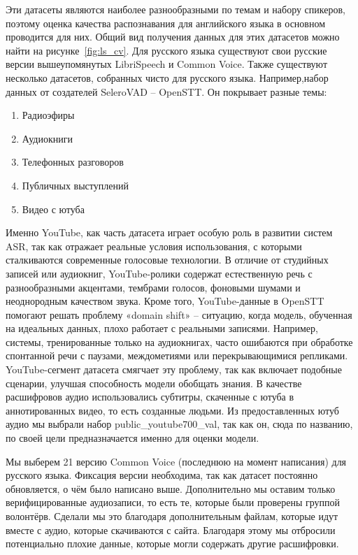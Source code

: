 Эти датасеты являются наиболее разнообразными по темам и набору спикеров, поэтому оценка качества распознавания для английского языка в основном проводится для них.
Общий вид получения данных для этих датасетов можно найти на рисунке~\ref{fig:ls_cv}.
Для русского языка существуют свои русские версии вышеупомянутых LibriSpeech и Common Voice.
Также существуют несколько датасетов, собранных чисто для русского языка. 
Например,набор данных от создателей SeleroVAD -- OpenSTT\cite{andrusenko2020exploration}. 
Он покрывает разные темы: 
\begin{enumerate}
  \item Радиоэфиры
  \item Аудиокниги
  \item Телефонных разговоров
  \item Публичных выступлений
  \item Видео с ютуба
\end{enumerate}
Именно YouTube, как часть датасета играет особую роль в развитии систем ASR, так как отражает реальные условия использования, с которыми сталкиваются современные голосовые технологии.
В отличие от студийных записей или аудиокниг, YouTube-ролики содержат естественную речь с разнообразными акцентами, тембрами голосов, фоновыми шумами и неоднородным качеством звука. 
Кроме того, YouTube-данные в OpenSTT помогают решать проблему «domain shift» -- ситуацию, когда модель, обученная на идеальных данных, плохо работает с реальными записями.
Например, системы, тренированные только на аудиокнигах, часто ошибаются при обработке спонтанной речи с паузами, междометиями или перекрывающимися репликами.
YouTube-сегмент датасета смягчает эту проблему, так как включает подобные сценарии, улучшая способность модели обобщать знания.
В качестве расшифровов аудио использовались субтитры, скаченные с ютуба в аннотированных видео, то есть созданные людьми.
Из предоставленных ютуб аудио мы выбрали набор public\_youtube700\_val, так как он, сюда по названию, по своей цели предназначается именно для оценки модели.

Мы выберем 21 версию Common Voice (последнюю на момент написания) для русского языка.
Фиксация версии необходима, так как датасет постоянно обновляется, о чём было написано выше.
Дополнительно мы оставим только верифицированные аудиозаписи, то есть те, которые были проверены группой волонтёрв.
Сделали мы это благодаря дополнительным файлам, которые идут вместе с аудио, которые скачиваются с сайта.
Благодаря этому мы отбросили потенциально плохие данные, которые могли содержать другие расшифровки.

